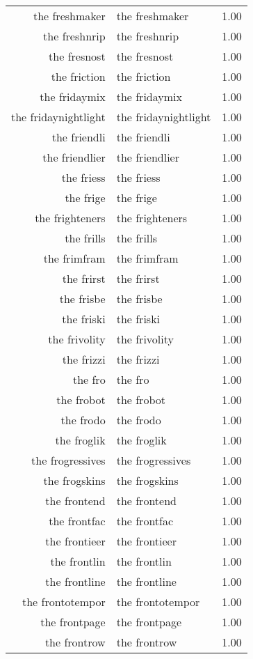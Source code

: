 \begin{table}[ht]
\begin{tabular}{rlr}
  the freshmaker & the freshmaker & 1.00 \\ 
  the freshnrip & the freshnrip & 1.00 \\ 
  the fresnost & the fresnost & 1.00 \\ 
  the friction & the friction & 1.00 \\ 
  the fridaymix & the fridaymix & 1.00 \\ 
  the fridaynightlight & the fridaynightlight & 1.00 \\ 
  the friendli & the friendli & 1.00 \\ 
  the friendlier & the friendlier & 1.00 \\ 
  the friess & the friess & 1.00 \\ 
  the frige & the frige & 1.00 \\ 
  the frighteners & the frighteners & 1.00 \\ 
  the frills & the frills & 1.00 \\ 
  the frimfram & the frimfram & 1.00 \\ 
  the frirst & the frirst & 1.00 \\ 
  the frisbe & the frisbe & 1.00 \\ 
  the friski & the friski & 1.00 \\ 
  the frivolity & the frivolity & 1.00 \\ 
  the frizzi & the frizzi & 1.00 \\ 
  the fro & the fro & 1.00 \\ 
  the frobot & the frobot & 1.00 \\ 
  the frodo & the frodo & 1.00 \\ 
  the froglik & the froglik & 1.00 \\ 
  the frogressives & the frogressives & 1.00 \\ 
  the frogskins & the frogskins & 1.00 \\ 
  the frontend & the frontend & 1.00 \\ 
  the frontfac & the frontfac & 1.00 \\ 
  the frontieer & the frontieer & 1.00 \\ 
  the frontlin & the frontlin & 1.00 \\ 
  the frontline & the frontline & 1.00 \\ 
  the frontotempor & the frontotempor & 1.00 \\ 
  the frontpage & the frontpage & 1.00 \\ 
  the frontrow & the frontrow & 1.00 \\ 

\end{tabular}
\end{table}
